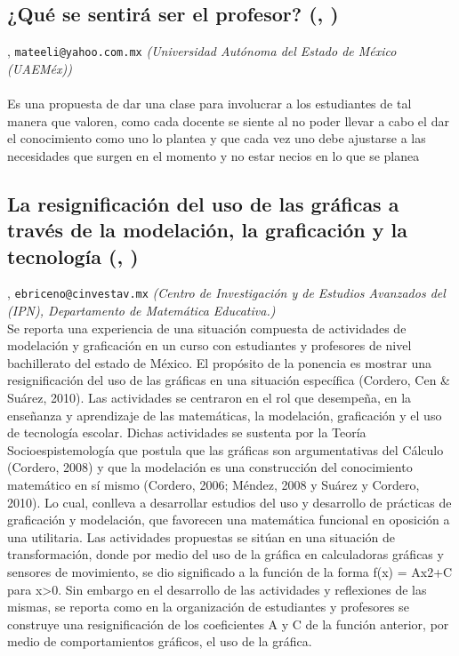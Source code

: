 \subsection{\sffamily ¿Qué se sentirá ser el profesor? {\footnotesize (, )}} \label{reg-1235} 
, {\tt mateeli@yahoo.com.mx}  {\slshape (Universidad Autónoma del Estado de México (UAEMéx))}\\
\\
\noindent Es una propuesta de dar una clase para involucrar a los estudiantes de tal manera que valoren, como cada docente se siente al no poder llevar a cabo el dar el conocimiento como uno lo plantea y que cada vez uno debe ajustarse a las necesidades que surgen en el momento y no estar necios en lo que se planea
\subsection{\sffamily La resignificación del uso de las gráficas a través de la modelación, la graficación y la tecnología {\footnotesize (, )}} \label{reg-1883} 
, {\tt ebriceno@cinvestav.mx}  {\slshape (Centro de Investigación y de Estudios Avanzados del (IPN), Departamento de Matemática Educativa.)}\\
          \noindent Se reporta una experiencia de una situación compuesta de actividades de modelación y graficación en un curso con estudiantes y profesores de nivel bachillerato del estado de México. El propósito de la ponencia es mostrar una resignificación del uso de las gráficas  en una situación específica (Cordero, Cen & Suárez, 2010). Las actividades se centraron en el rol que desempeña, en la enseñanza y aprendizaje de las matemáticas, la modelación, graficación y el uso de tecnología escolar. Dichas actividades se sustenta por la Teoría Socioespistemología que postula que las gráficas son argumentativas del Cálculo (Cordero, 2008) y que la modelación es una construcción del conocimiento matemático en sí mismo (Cordero, 2006; Méndez, 2008 y Suárez y Cordero, 2010). Lo cual, conlleva a desarrollar estudios del uso y desarrollo de prácticas de graficación y modelación, que favorecen una matemática funcional en oposición a una utilitaria. Las actividades propuestas se sitúan en una situación de transformación, donde por medio del uso de la gráfica en calculadoras gráficas y sensores de movimiento, se dio significado a la función de la forma f(x) = Ax2+C para x>0. Sin embargo en el desarrollo de las actividades y reflexiones de las mismas, se reporta como en la organización de estudiantes y profesores se construye una resignificación  de los coeficientes A y C de la función anterior, por medio de comportamientos gráficos, el uso de la gráfica.
